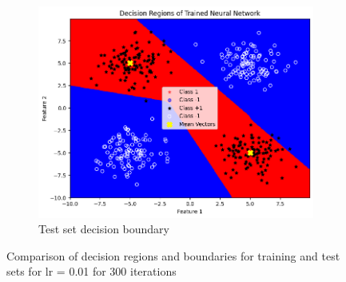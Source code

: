 \documentclass[a4paper,12pt]{article}
\begin{document}
\begin{figure}[H]
    \begin{subfigure}{0.45\textwidth}
        \centering
        \includegraphics[width=\textwidth]{2.3_.01_300_Test.png}
        \caption{Test set decision boundary}
    \end{subfigure}

    \caption{Comparison of decision regions and boundaries for training and test sets for lr = 0.01 for 300 iterations}
\end{figure}
\end{document}
